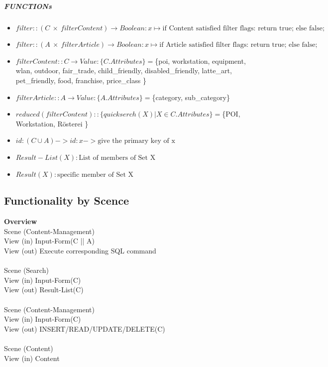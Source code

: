 \subparagraph{FUNCTIONs}
\begin{itemize}
\item $filter:: (C ~\times~ filterContent) \rightarrow Boolean: x \mapsto \textrm{if Content satisfied filter flags: return true; else false;}$
\item $filter:: (A ~\times~ filterArticle) \rightarrow Boolean: x \mapsto \textrm{if Article satisfied filter flags: return true; else false;}$
\item  $filterContent:: C \rightarrow Value: \{C.Attributes\} = $\{poi, workstation, equipment, wlan, outdoor, fair\_trade, child\_friendly, disabled\_friendly, latte\_art, pet\_friendly, food, franchise, price\_class \}
\item  $filterArticle:: A \rightarrow Value: \{A.Attributes\} = $\{category, sub\_category\} 
\item $reduced(filterContent):: \{quickserch(X) | X  \in C.Attributes\} = $\{POI, Workstation, Rösterei \}
\item $id: (C \cup A) -> id: x ->  \textrm{give the primary key of x}$
\item $Result-List(X): \textrm{List of members of Set X}$
\item $Result(X): \textrm{specific member of Set X}$
\end{itemize}



\subsection*{Functionality by Scence}
\textbf{Overview}\\
Scene (Content-Management)\\
View (in)   Input-Form(C || A)\\
View (out)  Execute corresponding SQL command\\
\\
Scene (Search)\\
View (in)   Input-Form(C)\\
View (out)  Result-List(C)\\
\\
Scene (Content-Management)\\
View (in)   Input-Form(C)\\
View (out)  INSERT/READ/UPDATE/DELETE(C)\\
\\
Scene (Content)\\
View (in)   Content\\
\\\\



